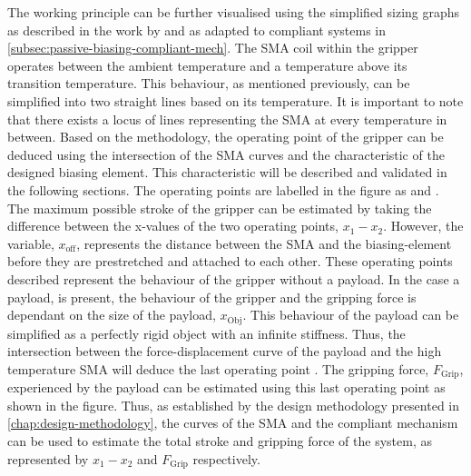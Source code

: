 The working principle can be further visualised using the simplified sizing graphs as described in the work by \cite{spaggiariDesignEquationsBinary2013} and as adapted to compliant systems in \cref{subsec:passive-biasing-compliant-mech}. The SMA coil within the gripper operates between the ambient temperature and a temperature above its transition temperature. This behaviour, as mentioned previously, can be simplified into two straight lines based on its temperature. It is important to note that there exists a locus of lines representing the SMA at every temperature in between. Based on the methodology, the operating point of the gripper can be deduced using the intersection of the SMA curves and the characteristic of the designed biasing element. This characteristic will be described and validated in the following sections. The operating points are labelled in the figure as  and . The maximum possible stroke of the gripper can be estimated by taking the difference between the x-values of the two operating points, $x_1-x_2$. However, the variable, $x_\mathrm{off}$, represents the distance between the SMA and the biasing-element before they are prestretched and attached to each other. These operating points described represent the behaviour of the gripper without a payload. In the case a payload, is present, the behaviour of the gripper and the gripping force is dependant on the size of the payload, $x_\mathrm{Obj}$. This behaviour of the payload can be simplified as a perfectly rigid object with an infinite stiffness. Thus, the intersection between the force-displacement curve of the payload and the high temperature SMA will deduce the last operating point . The gripping force, $F_\mathrm{Grip}$, experienced by the payload can be estimated using this last operating point as shown in the figure. Thus, as established by the design methodology presented in \cref{chap:design-methodology}, the curves of the SMA and the compliant mechanism can be used to estimate the total stroke and gripping force of the system, as represented by $x_1-x_2$ and $F_\mathrm{Grip}$ respectively.
